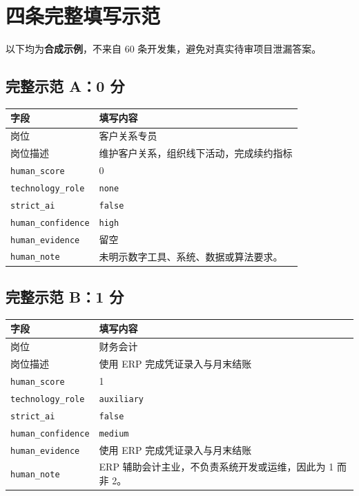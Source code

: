 \documentclass[11pt,a4paper,fontset=none]{ctexart}
\newcommand{\field}[1]{\nolinkurl{#1}}
\begin{document}
\section{四条完整填写示范}

以下均为\textbf{合成示例}，不来自 60 条开发集，避免对真实待审项目泄漏答案。

\subsection{完整示范 A：0 分}

\noindent\begin{tabularx}{\textwidth}{L{3.2cm}Y}
\toprule
字段 & 填写内容\\
\midrule
岗位 & 客户关系专员\\
岗位描述 & 维护客户关系，组织线下活动，完成续约指标\\
\field{human_score} & 0\\
\field{technology_role} & \texttt{none}\\
\field{strict_ai} & \texttt{false}\\
\field{human_confidence} & \texttt{high}\\
\field{human_evidence} & 留空\\
\field{human_note} & 未明示数字工具、系统、数据或算法要求。\\
\bottomrule
\end{tabularx}

\subsection{完整示范 B：1 分}

\noindent\begin{tabularx}{\textwidth}{L{3.2cm}Y}
\toprule
字段 & 填写内容\\
\midrule
岗位 & 财务会计\\
岗位描述 & 使用 ERP 完成凭证录入与月末结账\\
\field{human_score} & 1\\
\field{technology_role} & \texttt{auxiliary}\\
\field{strict_ai} & \texttt{false}\\
\field{human_confidence} & \texttt{medium}\\
\field{human_evidence} & 使用 ERP 完成凭证录入与月末结账\\
\field{human_note} & ERP 辅助会计主业，不负责系统开发或运维，因此为 1 而非 2。\\
\bottomrule
\end{tabularx}
\end{document}
